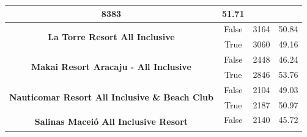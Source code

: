 \begin{table}[h]
\begin{tabular}{|c|c|r|r|}
		8383                                                                    &
		51.71                                                                     \\ \hline
		\multirow{2}{*}{\textbf{La Torre Resort All Inclusive}}                 &
		False                                                                   &
		3164                                                                    &
		50.84                                                                     \\ \cline{2-4}
		                                                                        &
		True                                                                    &
		3060                                                                    &
		49.16                                                                     \\ \hline
		\multirow{2}{*}{\textbf{Makai Resort Aracaju - All Inclusive}}          &
		False                                                                   &
		2448                                                                    &
		46.24                                                                     \\ \cline{2-4}
		                                                                        &
		True                                                                    &
		2846                                                                    &
		53.76                                                                     \\ \hline
		\multirow{2}{*}{\textbf{Nauticomar Resort All Inclusive \& Beach Club}} &
		False                                                                   &
		2104                                                                    &
		49.03                                                                     \\ \cline{2-4}
		                                                                        &
		True                                                                    &
		2187                                                                    &
		50.97                                                                     \\ \hline
		\multirow{2}{*}{\textbf{Salinas Maceió All Inclusive Resort}}           &
		False                                                                   &
		2140                                                                    &
		45.72                                                                     \\ \cline{2-4}

\end{tabular}
\end{table}
